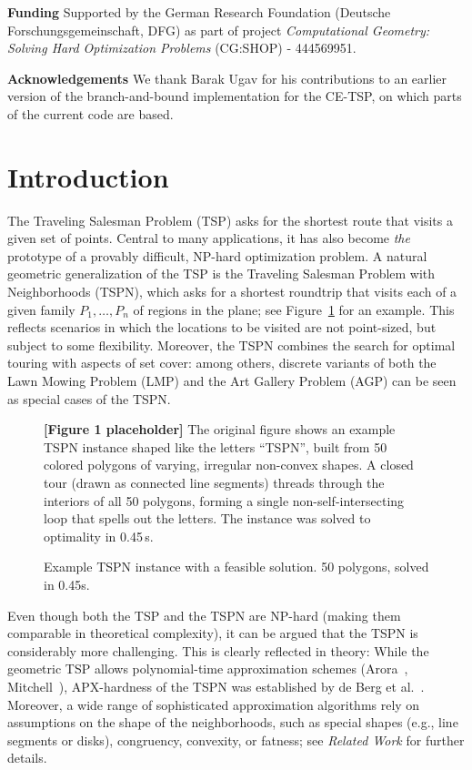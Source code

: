 \documentclass[11pt,a4paper]{article}
\theoremstyle{plain}
\begin{document}
\noindent\textbf{Funding} Supported by the German Research Foundation (Deutsche Forschungsgemeinschaft, DFG) as part of project \emph{Computational Geometry: Solving Hard Optimization Problems} (CG:SHOP) - 444569951.

\noindent\textbf{Acknowledgements} We thank Barak Ugav for his contributions to an earlier version of the branch-and-bound implementation for the CE-TSP, on which parts of the current code are based.

\section{Introduction}

The Traveling Salesman Problem (TSP) asks for the shortest route that visits a given set of points. Central to many applications, it has also become \emph{the} prototype of a provably difficult, NP-hard optimization problem. A natural geometric generalization of the TSP is the Traveling Salesman Problem with Neighborhoods (TSPN), which asks for a shortest roundtrip that visits each of a given family $P_1, \dots, P_n$ of regions in the plane; see Figure~\ref{fig:1} for an example. This reflects scenarios in which the locations to be visited are not point-sized, but subject to some flexibility. Moreover, the TSPN combines the search for optimal touring with aspects of set cover: among others, discrete variants of both the Lawn Mowing Problem (LMP) and the Art Gallery Problem (AGP) can be seen as special cases of the TSPN.

\begin{figure}[h]
\centering
\begin{figplaceholder}
\textbf{[Figure 1 placeholder]} The original figure shows an example TSPN instance shaped like the letters ``TSPN'', built from 50 colored polygons of varying, irregular non-convex shapes. A closed tour (drawn as connected line segments) threads through the interiors of all 50 polygons, forming a single non-self-intersecting loop that spells out the letters. The instance was solved to optimality in 0.45\,s.
\end{figplaceholder}
\caption{Example TSPN instance with a feasible solution. 50 polygons, solved in 0.45s.}
\label{fig:1}
\end{figure}

Even though both the TSP and the TSPN are NP-hard (making them comparable in theoretical complexity), it can be argued that the TSPN is considerably more challenging. This is clearly reflected in theory: While the geometric TSP allows polynomial-time approximation schemes (Arora~\cite{ref6}, Mitchell~\cite{ref37}), APX-hardness of the TSPN was established by de Berg et al.~\cite{ref14}. Moreover, a wide range of sophisticated approximation algorithms rely on assumptions on the shape of the neighborhoods, such as special shapes (e.g., line segments or disks), congruency, convexity, or fatness; see \emph{Related Work} for further details.
\end{document}
